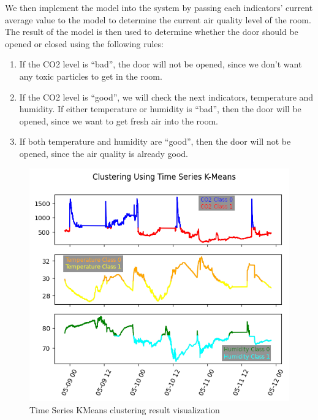 We then implement the model into the system by passing each
indicators' current average value to the model to determine
the current air quality level of the room. The result of the
model is then used to determine whether the door should be
opened or closed using the following rules:
\begin{enumerate}
    \item If the CO2 level is ``bad'', the door will not be
          opened, since we don't want any toxic particles to
          get in the room.
    \item If the CO2 level is ``good'', we will check the
          next indicators, temperature and humidity. If
          either temperature or humidity is ``bad'', then the
          door will be opened, since we want to get fresh
          air into the room.
    \item If both temperature and humidity are ``good'',
          then the door will not be opened, since the air
          quality is already good.
\end{enumerate}


\begin{figure}
    \centerline{\includegraphics[scale=0.65]{resources/iot-clustering.png}}
    \caption{Time Series KMeans clustering result visualization}
    \label{kmeans}
\end{figure}